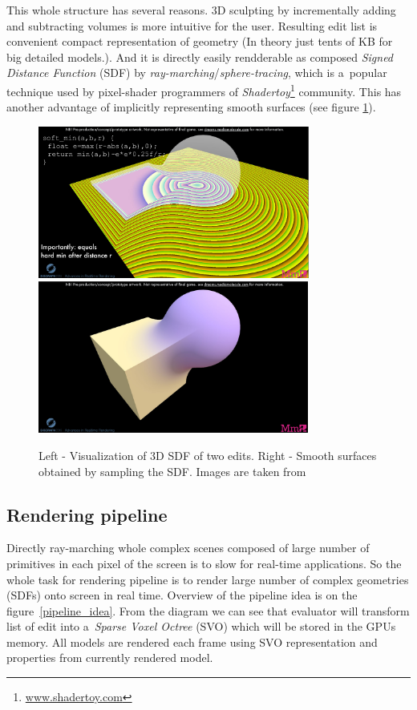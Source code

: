 \documentclass[11pt, a4paper]{article}
\begin{document}
This whole structure has several reasons.
3D sculpting by incrementally adding and subtracting volumes is more intuitive for the user.
Resulting edit list is convenient compact representation of geometry (In theory just tents of KB for big detailed models.).
And it is directly easily rendderable as composed \emph{Signed Distance Function} (SDF) by \emph{ray-marching}/\emph{sphere-tracing}, which is a~popular technique used by pixel-shader programmers of \emph{Shadertoy}\footnote{\href{www.shadertoy.com}{www.shadertoy.com}} community.
This has another advantage of implicitly representing smooth surfaces (see figure \ref{ray_marching_fig}).
\begin{figure}
    \centering
    \includegraphics[height=5cm,keepaspectratio]{SDF.png}
    \includegraphics[height=5cm,keepaspectratio]{SDF_RES.png}
    \caption{Left - Visualization of 3D SDF of two edits. Right - Smooth surfaces obtained by sampling the SDF. Images are taken from \cite{evans2015}}
    \label{ray_marching_fig}
\end{figure}
  
\subsection{Rendering pipeline}

Directly ray-marching whole complex scenes composed of large number of primitives in each pixel of the screen is to slow for real-time applications.
So the whole task for rendering pipeline is to render large number of complex geometries (SDFs) onto screen in real time.
Overview of the pipeline idea is on the figure~\ref{pipeline_idea}.
From the diagram we can see that evaluator will transform list of edit into a~\emph{Sparse Voxel Octree} (SVO) which will be stored in the GPUs memory.
All models are rendered each frame using SVO representation and properties from currently rendered model.
\end{document}
